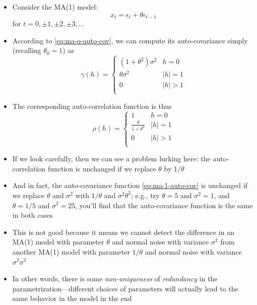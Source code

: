 \documentclass{article}
\begin{document}
\begin{itemize}
\item Consider the MA(1) model:
  \begin{equation}
  \label{eq:ma-1}
  x_t = \epsilon_t + \theta \epsilon_{t-1}
  \end{equation}
  for  $t = 0, \pm 1, \pm 2, \pm 3, \dots$ 

\item According to \eqref{eq:ma-q-auto-cov}, we can compute its auto-covariance 
  simply (recalling $\theta_0 = 1$) as
  \begin{equation}
  \label{eq:ma-1-auto-cov}  
  \gamma(h) = \begin{cases}
  (1+\theta^2) \sigma^2 & h = 0 \\
  \theta \sigma^2 & |h| = 1 \\
  0 & |h| > 1 \\
  \end{cases}
  \end{equation}

\item The corresponding auto-correlation function is thus
  \[
  \rho(h) = \begin{cases}
  1 & h = 0 \\
  \frac{\theta}{1+\theta^2} & |h| = 1 \\ 
  0 & |h| > 1 \\
  \end{cases}
  \]

\item If we look carefully, then we can see a problem lurking here: the
  auto-correlation function is unchanged if we replace $\theta$ by $1/\theta$

\item And in fact, the auto-covariance function \eqref{eq:ma-1-auto-cov} is
  unchanged if we replace $\theta$ and $\sigma^2$ with $1/\theta$ and $\sigma^2
  \theta^2$; e.g., try $\theta = 5$ and $\sigma^2 = 1$, and $\theta = 1/5$ and
  $\sigma^2 = 25$, you'll find that the auto-covariance function is the same in
  both cases 

\item This is not good because it means we cannot detect the difference in an
  MA(1) model with parameter $\theta$ and normal noise with variance $\sigma^2$ 
  from another MA(1) model with parameter $1/\theta$ and normal noise with
  variance $\sigma^2 \sigma^2$

\item In other words, there is some \emph{non-uniqueness} of \emph{redundancy}
  in the parametrization---different choices of parameters will actually lead to
  the same behavior in the model in the end


\end{itemize}
\end{document}
